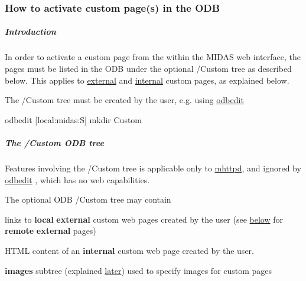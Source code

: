 \par




\par
 \label{index_end}
\hypertarget{index_end}{}
 \subsubsection{How to activate custom page(s) in the ODB}\label{RC_mhttpd_Activate}
\par
  \par
 \par
 \hypertarget{RC_mhttpd_Activate_RC_odb_custom_intro}{}\subparagraph{Introduction}\label{RC_mhttpd_Activate_RC_odb_custom_intro}
 In order to activate a custom page from the within the MIDAS web interface, the pages must be listed in the ODB under the optional /Custom  tree as described below. This applies to \hyperlink{RC_mhttpd_Activate_RC_odb_custom_external_example}{external} and \hyperlink{RC_mhttpd_Activate_RC_odb_custom_internal_example}{internal} custom pages, as explained below.

The /Custom tree must be created by the user, e.g. using \hyperlink{RC_odbedit_utility}{odbedit} 
\begin{DoxyCode}
odbedit
[local:midas:S] mkdir Custom
\end{DoxyCode}
 \label{RC_mhttpd_Activate_idx_mhttpd_buttons_custom}
\hypertarget{RC_mhttpd_Activate_idx_mhttpd_buttons_custom}{}
 \label{RC_mhttpd_Activate_idx_ODB_tree_custom}
\hypertarget{RC_mhttpd_Activate_idx_ODB_tree_custom}{}
 \hypertarget{RC_mhttpd_Activate_RC_odb_custom_tree}{}\subparagraph{The /Custom ODB tree}\label{RC_mhttpd_Activate_RC_odb_custom_tree}
Features involving the /Custom tree is applicable only to \hyperlink{RC_mhttpd}{mhttpd}, and ignored by \hyperlink{RC_odbedit}{odbedit} , which has no web capabilities.

\par
 The optional ODB /Custom tree may contain
\begin{DoxyItemize}
\item links to {\bfseries local} {\bfseries external} custom web pages created by the user (see \hyperlink{RC_mhttpd_Activate_remote}{below} for {\bfseries remote} {\bfseries external} pages)
\item HTML content of an {\bfseries internal} custom web page created by the user.
\item {\bfseries images} subtree (explained \hyperlink{RC_mhttpd_Image_access_RC_mhttpd_custom_image}{later}) used to specify images for custom pages
\end{DoxyItemize}

